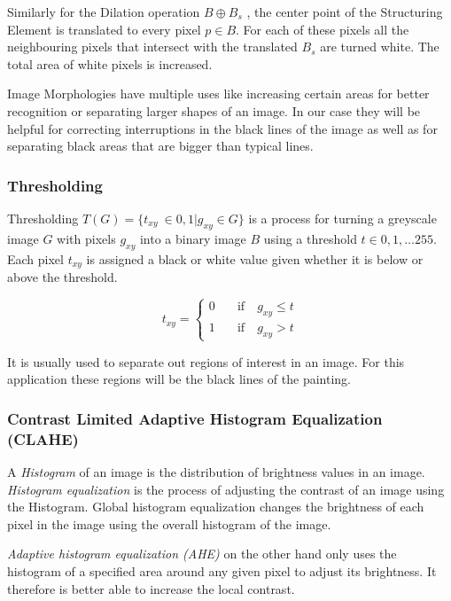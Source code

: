 \documentclass[serif,article,noparskip]{agse-thesis}
\begin{document}
Similarly for the Dilation operation  $B \oplus B_s$ , the center point of the
Structuring Element is translated to every pixel $p \in B$. For each of these
pixels all the neighbouring pixels that intersect with the translated $B_s$ are
turned white. The total area of white pixels is increased. \cite{Smith1997}

Image Morphologies have multiple uses like increasing certain areas for better
recognition or separating larger shapes of an image. In our case they will be
helpful for correcting interruptions in the black lines of the image as well as
for separating black areas that are bigger than typical lines.

\subsubsection{Thresholding}

Thresholding $T(G) = \{t_{xy}\ \in {0,1} | g_{xy} \in G\}$ is a process for turning a greyscale image $G$
with pixels $g_{xy}$ into a binary image $B$ using a threshold $t \in
0,1,\dots255$. Each pixel $t_{xy}$ is assigned a black or white value given
whether it is below or above the threshold.

\begin{equation}
  t_{xy} =
  \begin{cases}
    0 & \quad  \text{if}  \quad g_{xy} \leq t\\
    1  & \quad \text{if}  \quad g_{xy} > t
  \end{cases}
\end{equation}

It is usually used to separate out regions of interest in an image. For this
application these regions will be the black lines of the painting.

\subsubsection{Contrast Limited Adaptive Histogram
Equalization (CLAHE)}

A \textit{Histogram} of an image is the distribution of brightness values in an
image. \textit{Histogram equalization} is the process of adjusting the contrast
of an image using the Histogram. Global histogram equalization changes the
brightness of each pixel in the image using the overall histogram of the image.
\cite{ShapiroLindaG2001Cv}

\textit{Adaptive histogram equalization (AHE)} on the other hand only uses the
histogram of a specified area around any given pixel to adjust its brightness. It
therefore is better able to increase the local contrast.
\end{document}
